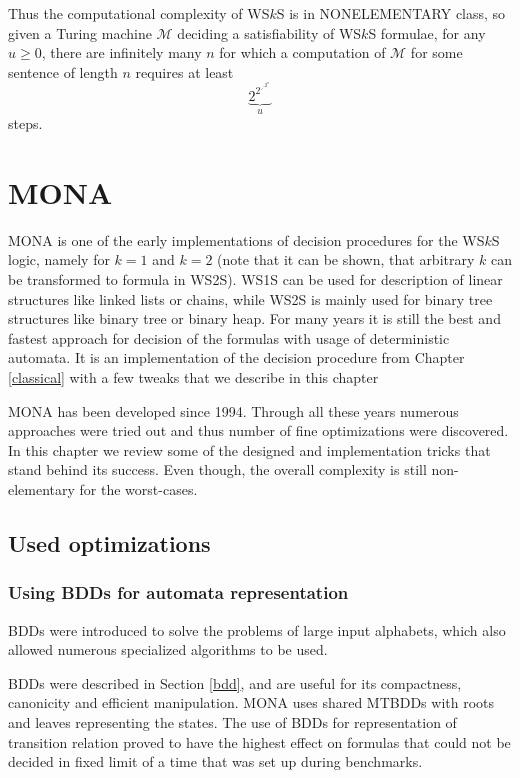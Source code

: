 Thus the computational complexity of WS$k$S is in NONELEMENTARY class, so given a Turing machine $\mathcal{M}$ deciding a satisfiability of WS$k$S formulae, for any $u \geq 0$, there are infinitely many $n$ for which a computation of $\mathcal{M}$ for some sentence of length $n$ requires at least $$\underbrace{2^{2^{\iddots^{2^n}}}}_u$$ steps.
	
\chapter{\textsc{MONA}}\label{monachap}

 \textsc{MONA} \cite{mona} is one of the early implementations of decision procedures for the WS$k$S logic, namely for $k = 1$ and $k = 2$ (note that it can be shown, that arbitrary $k$ can be transformed to formula in WS2S). WS1S can be used for description of linear structures like linked lists or chains, while WS2S is mainly used for binary tree structures like binary tree or binary heap. For many years it is still the best and fastest approach for decision of the formulas with usage of deterministic automata. It is an implementation of the decision procedure from Chapter \ref{classical} with a few tweaks that we describe in this chapter

\textsc{MONA} has been developed since 1994. Through all these years numerous approaches were tried out and thus number of fine optimizations were discovered. In this chapter we review some of the designed and implementation tricks that stand behind its success. Even though, the overall complexity is still non-elementary for the worst-cases. 

 \section{Used optimizations}\label{monasecrets}
\subsection{Using BDDs for automata representation}\label{monabdd}
BDDs were introduced to solve the problems of large input alphabets, which also allowed numerous specialized algorithms to be used.

BDDs were described in Section \ref{bdd}, and are useful for its compactness, canonicity and efficient manipulation. \textsc{MONA} uses shared MTBDDs with roots and leaves representing the states. The use of BDDs for representation  of transition relation proved to have the highest effect on formulas that could not be decided in fixed limit of a time that was set up during benchmarks.

